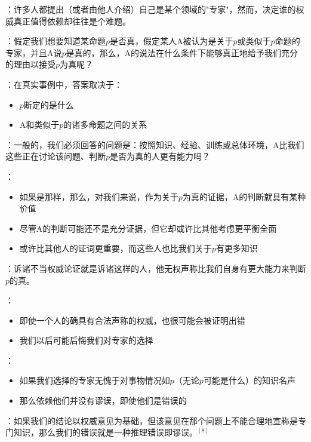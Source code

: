 \begin{theorembox}[title=确定合理权威的标准]
：许多人都提出（或者由他人介绍）自己是某个领域的"专家"，然而，决定谁的权威真正值得依赖却往往是个难题。

：假定我们想要知道某命题$p$是否真，假定某人A被认为是关于$p$或类似于$p$命题的专家，并且A说$p$是真的，那么，A的说法在什么条件下能够真正地给予我们充分的理由以接受$p$为真呢？

：在真实事例中，答案取决于：
\begin{itemize}
  \item $p$断定的是什么
  \item A和类似于$p$的诸多命题之间的关系
\end{itemize}

：一般的，我们必须回答的问题是：按照知识、经验、训练或总体环境，A比我们这些正在讨论该问题、判断$p$是否为真的人更有能力吗？

：
\begin{itemize}
  \item 如果是那样，那么，对我们来说，作为关于$p$为真的证据，A的判断就具有某种价值
  \item 尽管A的判断可能还不是充分证据，但它却或许比其他考虑更平衡全面
  \item 或许比其他人的证词更重要，而这些人也比我们关于$p$有更多知识
\end{itemize}
\end{theorembox}

\begin{theorembox}[title=谬误与合理权威的区别]
：诉诸不当权威论证就是诉诸这样的人，他无权声称比我们自身有更大能力来判断$p$的真。

：
\begin{itemize}
  \item 即使一个人的确具有合法声称的权威，也很可能会被证明出错
  \item 我们以后可能后悔我们对专家的选择
\end{itemize}

：
\begin{itemize}
  \item 如果我们选择的专家无愧于对事物情况如$p$（无论$p$可能是什么）的知识名声
  \item 那么依赖他们并没有谬误，即使他们是错误的
\end{itemize}

：如果我们的结论以权威意见为基础，但该意见在那个问题上不能合理地宣称是专门知识，那么我们的错误就是一种推理错误即谬误。$^{[8]}$
\end{theorembox}